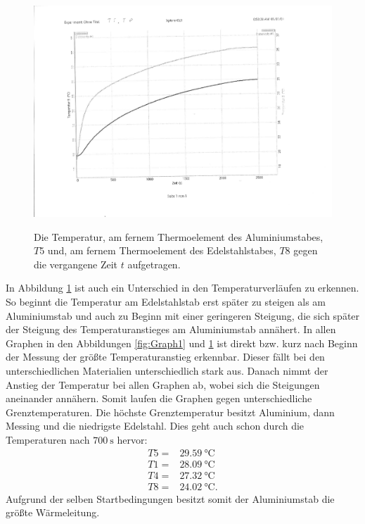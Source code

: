 \begin{figure}
	\centering
	\caption{Die Temperatur, am fernem Thermoelement des Aluminiumstabes, $T5$ und, am fernem Thermoelement des Edelstahlstabes, $T8$ gegen die vergangene Zeit $t$ aufgetragen.}
	\includegraphics[width=\linewidth-70pt,height=\textheight-70pt,keepaspectratio]{content/Bilder/T5T8-rotated.pdf}
	\label{fig:Graph2}
\end{figure}
In Abbildung \ref{fig:Graph2} ist auch ein Unterschied in den Temperaturverläufen zu erkennen. So beginnt die Temperatur am Edelstahlstab erst später zu steigen als am Aluminiumstab und auch zu Beginn mit einer geringeren Steigung, die sich später der Steigung des Temperaturanstieges am Aluminiumstab annähert.
In allen Graphen in den Abbildungen \ref{fig:Graph1} und \ref{fig:Graph2}  ist direkt bzw. kurz nach Beginn der Messung der größte Temperaturanstieg erkennbar. Dieser fällt bei den unterschiedlichen Materialien unterschiedlich stark aus. Danach nimmt der Anstieg der Temperatur bei allen Graphen ab, wobei sich die Steigungen aneinander annähern. Somit laufen die Graphen gegen unterschiedliche Grenztemperaturen. Die höchste Grenztemperatur besitzt Aluminium, dann Messing und die niedrigste Edelstahl. Dies geht auch schon durch die Temperaturen nach $\SI{700}{\second}$ hervor:
\begin{displaymath}
\begin{aligned}
T5 =& \SI{29.59}{\degreeCelsius}\\
T1 =& \SI{28.09}{\degreeCelsius}\\
T4 =& \SI{27.32}{\degreeCelsius}\\
T8 =& \SI{24.02}{\degreeCelsius}\text{.}
\end{aligned}
\end{displaymath}
Aufgrund der selben Startbedingungen besitzt somit der Aluminiumstab die größte Wärmeleitung.


